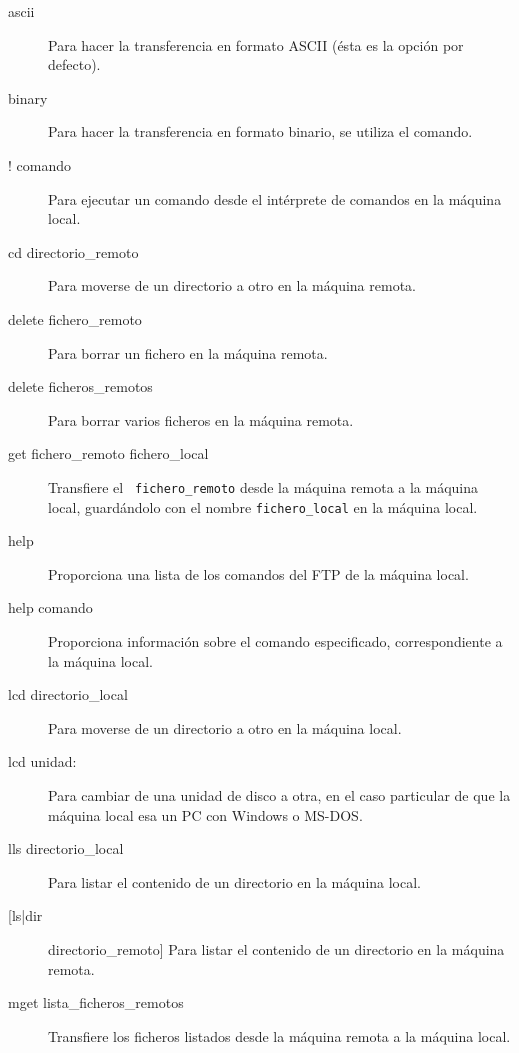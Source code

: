\begin{description}

\item[ascii] Para hacer la transferencia  en formato ASCII (ésta es la
opción por defecto).

\item[binary]  Para  hacer la  transferencia  en  formato binario,  se
utiliza el comando.

\item[!  comando] Para  ejecutar  un comando  desde  el intérprete  de
comandos en la máquina local.

\item[cd directorio\_remoto] Para  moverse de un directorio  a otro en
la máquina remota.

\item[delete  fichero\_remoto] Para  borrar un  fichero en  la máquina
remota.

\item[delete  ficheros\_remotos] Para  borrar  varios  ficheros en  la
máquina remota.

\item[get   fichero\_remoto   fichero\_local]   Transfiere   el   {\tt
fichero\_remoto}  desde   la  máquina   remota  a  la   máquina  local,
guardándolo con el nombre {\tt fichero\_local} en la máquina local.

\item[help]  Proporciona una  lista  de  los comandos  del  FTP de  la
máquina local.

\item[help   comando]  Proporciona   información   sobre  el   comando
especificado, correspondiente a la máquina local.

\item[lcd directorio\_local] Para  moverse de un directorio  a otro en
la máquina local.

\item[lcd unidad:] Para  cambiar de una unidad de disco  a otra, en el
caso  particular de  que la  máquina  local esa  un PC  con Windows  o
MS-DOS.

\item[lls directorio\_local] Para listar el contenido de un directorio
en la máquina local.

\item[[ls|dir]  directorio\_remoto] Para  listar  el  contenido de  un
directorio en la máquina remota.

\item[mget lista\_ficheros\_remotos] Transfiere  los ficheros listados
desde la máquina remota a la máquina local.


\end{description}
